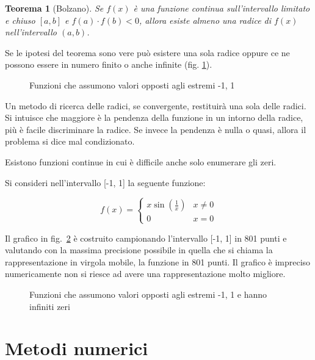 \documentclass[12pt]{article}
\theoremstyle{plain}%
\newtheorem{thm}{Teorema}[section]
\theoremstyle{definition}
\theoremstyle{remark}
\begin{document}
\begin{thm}[Bolzano]
Se $f (x)$ è una funzione continua sull'intervallo limitato e chiuso $[a, b]$ e $f (a) \cdot f (b) < 0$, allora esiste almeno una radice di $f (x)$ nell'intervallo $(a, b)$.
\end{thm}

Se le ipotesi del teorema sono vere può esistere una sola radice oppure ce ne possono essere in numero finito o anche infinite (fig. \ref{fig:ipotesibolzano}).

\begin{figure}[!htbp]
    \centering
    
    \caption{Funzioni che assumono valori opposti agli estremi -1, 1}
    \label{fig:ipotesibolzano}
\end{figure}

Un metodo di ricerca delle radici, se convergente, restituirà una sola delle radici.
Si intuisce che maggiore è la pendenza della funzione in un intorno della radice, più è facile discriminare la radice. Se invece la pendenza è nulla o quasi, allora il problema si dice mal condizionato.

Esistono funzioni continue in cui è difficile anche solo enumerare gli zeri.

Si consideri nell'intervallo [-1, 1] la seguente funzione:

\begin{equation*}
    f(x) =
    \begin{cases}
        x \sin(\frac{1}{x}) & x \neq 0\\
        0                   & x = 0
    \end{cases}
\end{equation*}

Il grafico in fig.~\ref{fig:tantizeri} è costruito campionando l'intervallo [-1, 1] in 801 punti e valutando con la
massima precisione possibile in quella che si chiama la rappresentazione in virgola mobile, la funzione in 801 punti.
Il grafico è impreciso numericamente non si riesce ad avere una rappresentazione molto migliore.

\begin{figure}[!htbp]
    \centering
    
    \caption{Funzioni che assumono valori opposti agli estremi -1, 1 e hanno infiniti zeri}
    \label{fig:tantizeri}
\end{figure}


\section{Metodi numerici}
\end{document}
